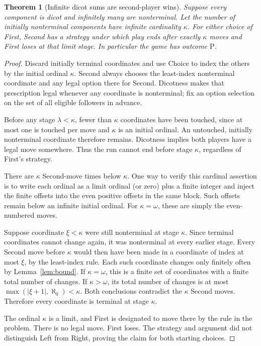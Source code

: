 \documentclass[11pt,a4paper]{article}
\newtheorem{theorem}{Theorem}[section]
\theoremstyle{definition}\newtheorem{definition}[theorem]{Definition}
\theoremstyle{remark}\newtheorem{remark}[theorem]{Remark}
\newcommand{\1}{\mathbf 1}
\begin{document}
\begin{theorem}[Infinite dicot sums are second-player wins]\label{thm:dicot}
Suppose every component is dicot and infinitely many are nonterminal. Let the number of initially nonterminal components have infinite cardinality $\kappa$. For either choice of First, Second has a strategy under which play ends after exactly $\kappa$ moves and First loses at that limit stage. In particular the game has outcome $\mathrm P$.
\end{theorem}
\begin{proof}
Discard initially terminal coordinates and use Choice to index the others by the initial ordinal $\kappa$. Second always chooses the least-index nonterminal coordinate and any legal option there for Second. Dicotness makes that prescription legal whenever any coordinate is nonterminal; fix an option selection on the set of all eligible followers in advance.

Before any stage $\lambda<\kappa$, fewer than $\kappa$ coordinates have been touched, since at most one is touched per move and $\kappa$ is an initial ordinal. An untouched, initially nonterminal coordinate therefore remains. Dicotness implies both players have a legal move somewhere. Thus the run cannot end before stage $\kappa$, regardless of First's strategy.

There are $\kappa$ Second-move times below $\kappa$. One way to verify this cardinal assertion is to write each ordinal as a limit ordinal (or zero) plus a finite integer and inject the finite offsets into the even positive offsets in the same block. Such offsets remain below an infinite initial ordinal. For $\kappa=\omega$, these are simply the even-numbered moves.

Suppose coordinate $\xi<\kappa$ were still nonterminal at stage $\kappa$. Since terminal coordinates cannot change again, it was nonterminal at every earlier stage. Every Second move before $\kappa$ would then have been made in a coordinate of index at most $\xi$, by the least-index rule. Each such coordinate changes only finitely often by Lemma~\ref{lem:bound}. If $\kappa=\omega$, this is a finite set of coordinates with a finite total number of changes. If $\kappa>\omega$, its total number of changes is at most
$\max(|\xi+1|,\aleph_0)<\kappa$. Both conclusions contradict the $\kappa$ Second moves. Therefore every coordinate is terminal at stage $\kappa$.

The ordinal $\kappa$ is a limit, and First is designated to move there by the rule in the problem. There is no legal move. First loses. The strategy and argument did not distinguish Left from Right, proving the claim for both starting choices.
\end{proof}
\end{document}
